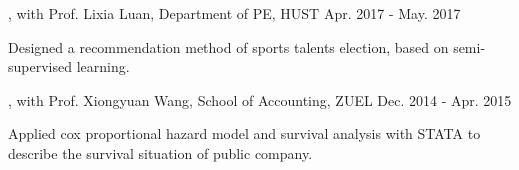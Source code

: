 \begin{cventries}
\cvexperience
{, with Prof. Lixia Luan, Department of PE, HUST}
{Apr. 2017 - May. 2017}
{
    \begin{cvitems}
    \item {Designed a recommendation method of sports talents election, based on semi-supervised learning.}
    \end{cvitems}
}

\cvexperience
{, with Prof. Xiongyuan Wang, School of Accounting, ZUEL}
{Dec. 2014 - Apr. 2015}
{
    \begin{cvitems}
    \item {Applied cox proportional hazard model and survival analysis with STATA to describe the survival situation of public company.}
    \end{cvitems}
}
\end{cventries}